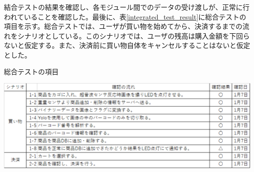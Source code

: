 結合テストの結果を確認し、各モジュール間でのデータの受け渡しが、正常に行われていることを確認した。最後に、表\ref{integrated_test_result}に総合テストの項目を示す。総合テストでは、ユーザが買い物を始めてから、決済するまでの流れをシナリオとしている。このシナリオでは、ユーザの残高は購入金額を下回らないと仮定する。また、決済前に買い物自体をキャンセルすることはないと仮定とした。

\begin{table}[htbp]
\centering
\caption{総合テストの項目}
\includegraphics[width=15cm]{./pic/result/integrated_test_result.eps}
\label{integrated_test_result}
\end{table}